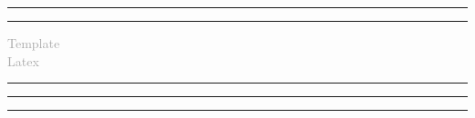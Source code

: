 \documentclass[a4paper, 12pt]{article} %
\begin{document}
\pagecolor{cyan}
\begin{titlepage} %
	
	\centering %
	
	
	\rule{\textwidth}{2pt} %
	
	\vspace{2pt}\vspace{-\baselineskip} %
	
	\rule{\textwidth}{0.5pt} %
	
	\vspace{0.1\textheight} %
	
	
	\textcolor{darkgray}{
		{\Large Template}\\[0.5\baselineskip] %
		{\Large Latex} %
	}
	\vspace{0.025\textheight} %
	
	\rule{0.3\textwidth}{0.4pt} %
	
	\vspace{0.1\textheight} 
	
	\vfill %
	
	
	\rule{\textwidth}{0.4pt} %
	
	\vspace{2pt}\vspace{-\baselineskip} %
	
	\rule{\textwidth}{1pt} %
	
\end{titlepage}


\newlength{\PageFrameTopMargin}
\newlength{\PageFrameBottomMargin}
\newlength{\PageFrameLeftMargin}
\newlength{\PageFrameRightMargin}

\setlength{\PageFrameTopMargin}{1cm}
\setlength{\PageFrameBottomMargin}{1cm}
\setlength{\PageFrameLeftMargin}{1cm}
\setlength{\PageFrameRightMargin}{1cm}
\end{document}
